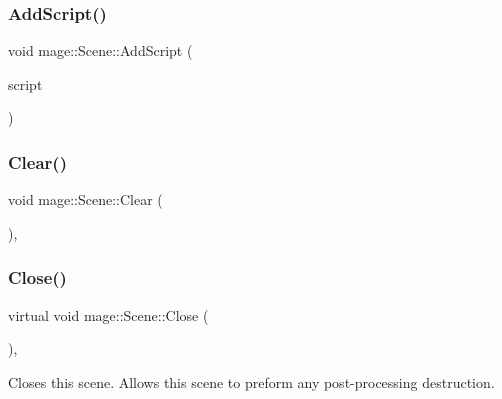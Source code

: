 \hypertarget{classmage_1_1_scene_ab97b66c81c32681699052e154d0e0722}{}\label{classmage_1_1_scene_ab97b66c81c32681699052e154d0e0722} 
\subsubsection{\texorpdfstring{Add\+Script()}{AddScript()}}
{\footnotesize\ttfamily void mage\+::\+Scene\+::\+Add\+Script (\begin{DoxyParamCaption}\item[{\hyperlink{namespacemage_a1e01ae66713838a7a67d30e44c67703e}{Shared\+Ptr}$<$ \hyperlink{classmage_1_1_behavior_script}{Behavior\+Script} $>$}]{script }\end{DoxyParamCaption})}

\hypertarget{classmage_1_1_scene_adf4a5b3885e34336caa5f145f55e01e1}{}\label{classmage_1_1_scene_adf4a5b3885e34336caa5f145f55e01e1} 
\subsubsection{\texorpdfstring{Clear()}{Clear()}}
{\footnotesize\ttfamily void mage\+::\+Scene\+::\+Clear (\begin{DoxyParamCaption}{ }\end{DoxyParamCaption})\hspace{0.3cm}{\ttfamily [private]}, {\ttfamily [noexcept]}}

\hypertarget{classmage_1_1_scene_a16786d7fcf0b813e2e94061b082cfd1d}{}\label{classmage_1_1_scene_a16786d7fcf0b813e2e94061b082cfd1d} 
\subsubsection{\texorpdfstring{Close()}{Close()}}
{\footnotesize\ttfamily virtual void mage\+::\+Scene\+::\+Close (\begin{DoxyParamCaption}{ }\end{DoxyParamCaption})\hspace{0.3cm}{\ttfamily [private]}, {\ttfamily [virtual]}}

Closes this scene. Allows this scene to preform any post-\/processing destruction. \hypertarget{classmage_1_1_scene_abfce90d15a9aa5b5e05709b35286de88}{}\label{classmage_1_1_scene_abfce90d15a9aa5b5e05709b35286de88} 
